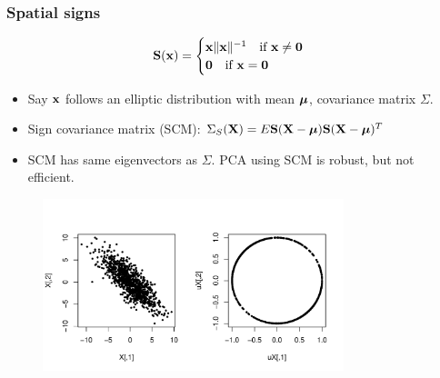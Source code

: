 \documentclass[handout,10pt]{beamer}
\begin{document}
\begin{frame}
\frametitle{Spatial signs \citep{locantore99}}
$$ {\mathbf{S}}({\bf{x}}) = \begin{cases} {\bf{x}}\| {\bf{x}} \|^{-1} \quad \mbox{if }{\bf{x}} \neq \bf0\\
\bf0 \quad \mbox{if }{\bf{x}} = \bf0 \end{cases} $$

\begin{itemize}
\item Say ${\bf{x}}$ follows an elliptic distribution with mean ${\boldsymbol{\mu}}$, covariance matrix $\Sigma$.
\item Sign covariance matrix (SCM): $\Sigma_S({\mathbf{X}}) = E{\mathbf{S}} ({\mathbf{X}} - {\boldsymbol{\mu}}){\mathbf{S}} ({\mathbf{X}} - {\boldsymbol{\mu}})^T$
\item SCM has same eigenvectors as $\Sigma$. PCA using SCM is robust, but not efficient.
\end{itemize}

\begin{figure}\begin{center}
   \includegraphics[height=5cm]{signs}
   \label{fig:fig2}
\end{center}\end{figure}
\end{frame}
\end{document}
